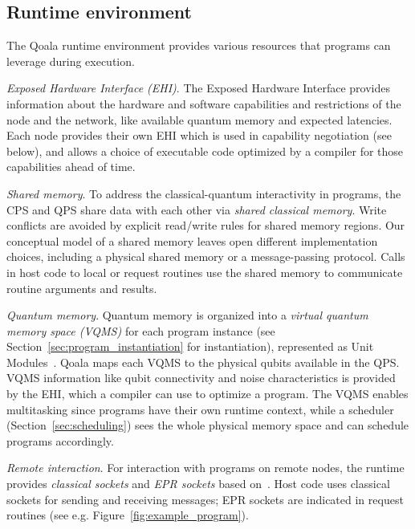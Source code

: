 \subsection{Runtime environment}
\label{sec:runtime_environment}
The Qoala runtime environment provides various resources that programs can leverage during execution.

\textit{Exposed Hardware Interface (EHI)}.
The Exposed Hardware Interface provides information about the hardware and software capabilities and restrictions of the node and the network,
like available quantum memory and expected latencies.
Each node provides their own EHI which is used in capability negotiation (see below), and allows a choice of executable code optimized by a compiler for those capabilities ahead of time. 

\textit{Shared memory}.
To address the classical-quantum interactivity in programs, the CPS and QPS share data with each other via \textit{shared classical memory}.
Write conflicts are avoided by explicit read/write rules for shared memory regions.
Our conceptual model of a shared memory leaves open different implementation choices, including a physical shared memory or a message-passing protocol.
Calls in host code to local or request routines use the shared memory to communicate routine arguments and results.

\textit{Quantum memory}.
Quantum memory is organized into a \textit{virtual quantum memory space (VQMS)} for each program instance (see Section~\ref{sec:program_instantiation} for instantiation), represented as Unit Modules~\cite{dahlberg2022netqasm}.
Qoala maps each VQMS to the physical qubits available in the QPS.
VQMS information like qubit connectivity and noise characteristics is provided by the EHI, which a compiler can use to optimize a program.
The VQMS enables multitasking since programs have their own runtime context, while a scheduler (Section~\ref{sec:scheduling}) sees the whole physical memory space and can schedule programs accordingly.

\textit{Remote interaction}. For interaction with programs on remote nodes,
the runtime provides \textit{classical sockets} and \textit{EPR sockets} based on~\cite{dahlberg2022netqasm}. Host code uses classical sockets for sending and receiving messages; EPR sockets are indicated in request routines (see e.g. Figure~\ref{fig:example_program}).

